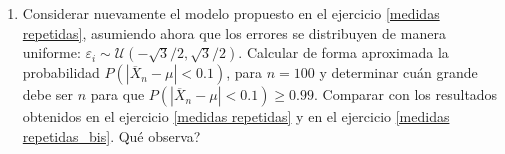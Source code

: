 \documentclass[11pt,a4paper,twoside]{article}%
\begin{document}
\begin{enumerate}
%
%
%
%
%
%
%

\item Considerar nuevamente el modelo propuesto en el ejercicio
\ref{medidas repetidas}, asumiendo ahora que los errores se 
distribuyen de manera uniforme: $\varepsilon_{i}\sim
\mathcal{U}(-\sqrt{3}/2,\sqrt{3}/2)$. Calcular de forma aproximada la
probabilidad $P\left(  |\overline{X}_{n}-\mu|<0.1\right)  $, para $n=100$ y
determinar cu\'an grande debe ser $n$ para que $P\left(  |\overline{X}_{n}%
-\mu|<0.1\right)  \geq0.99$. Comparar con los resultados obtenidos en  el 
ejercicio \ref{medidas repetidas} y en el ejercicio \ref{medidas repetidas_bis}. 
\textquestiondown Qu\'e observa?


\end{enumerate}
\end{document}
